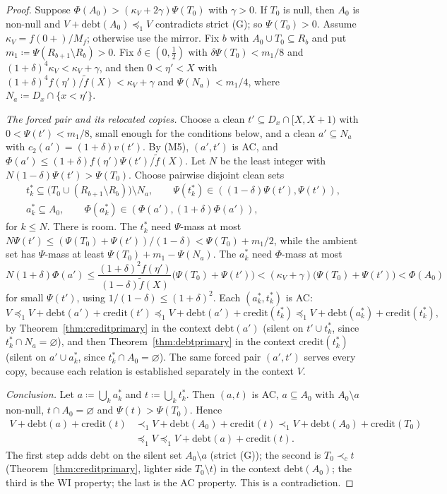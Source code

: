 \documentclass[11pt]{article}
\theoremstyle{definition}\newtheorem{definition}[theorem]{Definition}
\theoremstyle{remark}\newtheorem{remark}[theorem]{Remark}
\newcommand{\debt}{\mathrm{debt}}
\newcommand{\cred}{\mathrm{credit}}
\newcommand{\ftil}{\tilde f}
\begin{document}
\begin{proof}
Suppose $\Phi(A_0)>(\kappa_V+2\gamma)\Psi(T_0)$ with $\gamma>0$. If $T_0$ is
null, then $A_0$ is non-null and $V+\debt(A_0)\preceq_1V$ contradicts strict
(G); so $\Psi(T_0)>0$. Assume $\kappa_V=f(0+)/M_f$; otherwise use the mirror.
Fix $b$ with $A_0\cup T_0\subseteq R_b$ and put $m_1\coloneqq
\Psi(R_{b+1}\setminus R_b)>0$. Fix $\delta\in(0,\frac12)$ with
$\delta\Psi(T_0)<m_1/8$ and $(1+\delta)^4\kappa_V<\kappa_V+\gamma$, and then
$0<\eta'<X$ with
$(1+\delta)^4f(\eta')/\ftil(X)<\kappa_V+\gamma$ and $\Psi(N_a)<m_1/4$, where
$N_a\coloneqq D_x\cap\{x<\eta'\}$.

\emph{The forced pair and its relocated copies.} Choose a clean $t'\subseteq
D_x\cap[X,X+1)$ with $0<\Psi(t')<m_1/8$, small enough for the conditions
below, and a clean $a'\subseteq N_a$ with $c_2(a')=(1+\delta)v(t')$. By (M5),
$(a',t')$ is AC, and $\Phi(a')\le(1+\delta)f(\eta')\Psi(t')/\ftil(X)$. Let
$N$ be the least integer with $N(1-\delta)\Psi(t')>\Psi(T_0)$. Choose pairwise
disjoint clean sets
\begin{gather*}
 t^*_k\subseteq\bigl(T_0\cup(R_{b+1}\setminus R_b)\bigr)\setminus N_a,\qquad
 \Psi(t^*_k)\in((1-\delta)\Psi(t'),\Psi(t')),\\
 a^*_k\subseteq A_0,\qquad\Phi(a^*_k)\in(\Phi(a'),(1+\delta)\Phi(a')),
\end{gather*}
for $k\le N$. There is room. The $t^*_k$ need $\Psi$-mass at most
$N\Psi(t')\le(\Psi(T_0)+\Psi(t'))/(1-\delta)<\Psi(T_0)+m_1/2$, while the
ambient set has $\Psi$-mass at least $\Psi(T_0)+m_1-\Psi(N_a)$. The
$a^*_k$ need $\Phi$-mass at most
\[
 N(1+\delta)\Phi(a')\le\frac{(1+\delta)^2f(\eta')}{(1-\delta)\ftil(X)}
 \bigl(\Psi(T_0)+\Psi(t')\bigr)<(\kappa_V+\gamma)\bigl(\Psi(T_0)+\Psi(t')
 \bigr)<\Phi(A_0)
\]
for small $\Psi(t')$, using $1/(1-\delta)\le(1+\delta)^2$. Each
$(a^*_k,t^*_k)$ is AC:
\[
 V\preceq_1V+\debt(a')+\cred(t')\preceq_1V+\debt(a')+\cred(t^*_k)
 \preceq_1V+\debt(a^*_k)+\cred(t^*_k),
\]
by Theorem~\ref{thm:creditprimary} in the context $\debt(a')$ (silent on
$t'\cup t^*_k$, since $t^*_k\cap N_a=\varnothing$), and then
Theorem~\ref{thm:debtprimary} in the context $\cred(t^*_k)$ (silent on
$a'\cup a^*_k$, since $t^*_k\cap A_0=\varnothing$). The same forced pair
$(a',t')$ serves every copy, because each relation is established separately
in the context $V$.

\emph{Conclusion.} Let $a\coloneqq\bigcup_ka^*_k$ and
$t\coloneqq\bigcup_kt^*_k$. Then $(a,t)$ is AC, $a\subseteq A_0$ with
$A_0\setminus a$ non-null, $t\cap A_0=\varnothing$ and $\Psi(t)>\Psi(T_0)$.
Hence
\begin{align*}
 V+\debt(a)+\cred(t)&\prec_1V+\debt(A_0)+\cred(t)\prec_1V+\debt(A_0)+
 \cred(T_0)\\
 &\preceq_1V\preceq_1V+\debt(a)+\cred(t).
\end{align*}
The first step adds debt on the silent set $A_0\setminus a$ (strict (G)); the
second is $T_0\prec_ct$ (Theorem~\ref{thm:creditprimary}, lighter side
$T_0\setminus t$) in the context $\debt(A_0)$; the third is the WI property;
the last is the AC property. This is a contradiction.
\end{proof}
\end{document}
